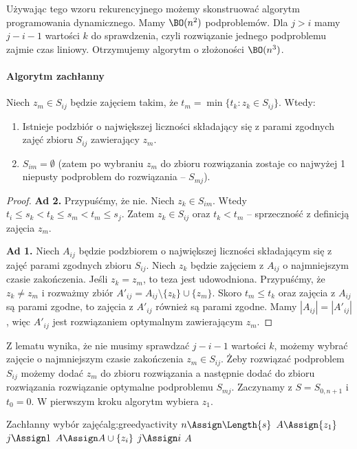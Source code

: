 Używając tego wzoru rekurencyjnego możemy skonstruować algorytm programowania dynamicznego. Mamy $\BO(n^2)$ podproblemów. Dla $j > i$ mamy $j - i - 1$ wartości $k$ do sprawdzenia, czyli rozwiązanie jednego podproblemu zajmie czas liniowy. Otrzymujemy algorytm o złożoności $\BO(n^3)$.

\paragraph{Algorytm zachłanny}
\begin{lemma}
	Niech $z_m \in S_{ij}$ będzie zajęciem takim, że $t_m = \min \{t_k : z_k \in S_{ij}\}$. Wtedy:
	\begin{enumerate}
		\item Istnieje podzbiór o największej liczności składający się z parami zgodnych zajęć zbioru $S_{ij}$ zawierający $z_m$.
		\item $S_{im} = \emptyset$ (zatem po wybraniu $z_m$ do zbioru rozwiązania zostaje co najwyżej 1 niepusty podproblem do rozwiązania -- $S_{mj}$).
	\end{enumerate}
\end{lemma}

\begin{proof}
	\textbf{Ad 2.} Przypuśćmy, że nie. Niech $z_k \in S_{im}$. Wtedy $t_i \leq s_k < t_k \leq s_m < t_m \leq s_j$. Zatem $z_k \in S_{ij}$ oraz $t_k < t_m$ -- sprzeczność z definicją zajęcia $z_m$.
	
	\textbf{Ad 1.} Niech $A_{ij}$ będzie podzbiorem o największej liczności składającym się z zajęć parami zgodnych zbioru $S_{ij}$. Niech $z_k$ będzie zajęciem z $A_{ij}$ o najmniejszym czasie zakończenia.
	Jeśli $z_k = z_m$, to teza jest udowodniona.
	Przypuśćmy, że $z_k \neq z_m$ i rozważmy zbiór $A'_{ij} = A_{ij} \setminus \{z_k\} \cup \{z_m\}$. Skoro $t_m \leq t_k$ oraz zajęcia z $A_{ij}$ są parami zgodne, to zajęcia z $A'_{ij}$ również są parami zgodne.
	Mamy $|A_{ij}| = |A'_{ij}|$, więc $A'_{ij}$ jest rozwiązaniem optymalnym zawierającym $z_m$.
\end{proof}

Z lematu wynika, że nie musimy sprawdzać $j - i - 1$ wartości $k$, możemy wybrać zajęcie o najmniejszym czasie zakończenia $z_m \in S_{ij}$.
Żeby rozwiązać podproblem $S_{ij}$ możemy dodać $z_m$ do zbioru rozwiązania a następnie dodać do zbioru rozwiązania rozwiązanie optymalne podproblemu $S_{mj}$. Zaczynamy z $S = S_{0, n+1}$ i $t_0 = 0$. W pierwszym kroku algorytm wybiera $z_1$.

\begin{alg}{Zachłanny wybór zajęć}{alg:greedyactivity}
	 
	\State $n \Assign \Length{s}$
	\State $A \Assign \{z_1\}$ 
	\State $j \Assign 1$
	\State $A \Assign A \cup \{z_i\}$
	\State $j \Assign i$
	\EndIf
	\EndFor
	\State \Return $A$
	\EndFunction
\end{alg}

